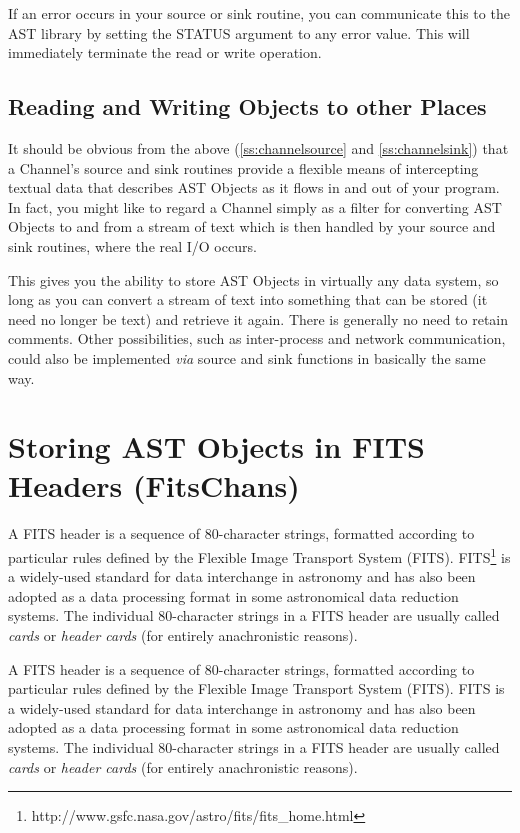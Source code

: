 \documentclass[twoside,11pt]{article}
\newcommand{\htmladdnormallink}[2]{#1}
\newenvironment{latexonly}{}{}
\newcommand{\htmlref}[2]{#1}
\newcommand{\secref}[1]{\S\ref{#1}}
\renewcommand{\secref}[1]{\ref{#1}}
\begin{document}
If an error occurs in your source or sink routine, you can communicate
this to the AST library by setting the STATUS argument to any error
value. This will immediately terminate the read or write operation.

\subsection{\label{ss:otherplaces}Reading and Writing Objects to other Places}

It should be obvious from the above (\secref{ss:channelsource} and
\secref{ss:channelsink}) that a \htmlref{Channel}{Channel}'s source and sink routines
provide a flexible means of intercepting textual data that describes
AST Objects as it flows in and out of your program. In fact, you might
like to regard a Channel simply as a filter for converting AST Objects
to and from a stream of text which is then handled by your source and
sink routines, where the real I/O occurs.

This gives you the ability to store AST Objects in virtually any data
system, so long as you can convert a stream of text into something
that can be stored (it need no longer be text) and retrieve it
again. There is generally no need to retain comments.  Other
possibilities, such as inter-process and network communication, could
also be implemented {\em{via}} source and sink functions in basically
the same way.

\cleardoublepage
\section{\label{ss:nativefits}Storing AST Objects in FITS Headers (FitsChans)}

\begin{latexonly}
A FITS header is a sequence of 80-character strings, formatted
according to particular rules defined by the Flexible Image Transport
\htmlref{System}{System}
(FITS). FITS\footnote{http://www.gsfc.nasa.gov/astro/fits/fits\_home.html}
is a widely-used standard for data interchange in astronomy and has
also been adopted as a data processing format in some astronomical
data reduction systems.  The individual 80-character strings in a FITS
header are usually called {\em{cards}} or {\em{header cards}} (for
entirely anachronistic reasons).
\end{latexonly}
\begin{htmlonly}
A FITS header is a sequence of 80-character strings, formatted
according to particular rules defined by the Flexible Image Transport
System (FITS).
\htmladdnormallink{FITS}{http://www.gsfc.nasa.gov/astro/fits/fits_home.html}
is a widely-used standard for data interchange in astronomy and has
also been adopted as a data processing format in some astronomical
data reduction systems.  The individual 80-character strings in a FITS
header are usually called {\em{cards}} or {\em{header cards}} (for
entirely anachronistic reasons).
\end{htmlonly}
\end{document}
